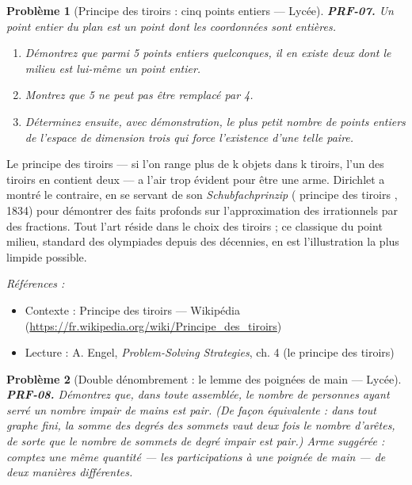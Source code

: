 \documentclass[11pt]{article}
\newtheorem{problem}{Problème}
\newenvironment{refs}{\par\small\noindent\emph{Références :}\begin{itemize}\setlength\itemsep{0pt}}{\end{itemize}\normalsize}
\begin{document}
\bigskip

\begin{problem}[{Principe des tiroirs : cinq points entiers --- Lycée}]
\textbf{PRF-07.} Un point entier du plan est un point dont les coordonnées sont
entières.
\begin{enumerate}
\item[(a)] Démontrez que parmi 5 points entiers quelconques, il en existe deux dont le milieu est
lui-même un point entier.
\item[(b)] Montrez que 5 ne peut pas être remplacé par 4.
\item[(c)] Déterminez ensuite, avec démonstration, le plus petit nombre de points entiers de
l'espace de dimension trois qui force l'existence d'une telle paire.
\end{enumerate}

\end{problem}

\noindent Le principe des tiroirs --- si l'on range plus de k objets dans k tiroirs,
l'un des tiroirs en contient deux --- a l'air trop évident pour être une arme. Dirichlet a
montré le contraire, en se servant de son \textit{Schubfachprinzip} (\og{} principe des tiroirs \fg{},
1834) pour démontrer des faits profonds sur l'approximation des irrationnels par des
fractions. Tout l'art réside dans le choix des tiroirs ; ce classique du point milieu,
standard des olympiades depuis des décennies, en est l'illustration la plus limpide
possible.

\begin{refs}
\item Contexte : Principe des tiroirs --- Wikipédia (\url{https://fr.wikipedia.org/wiki/Principe_des_tiroirs})
\item Lecture : A. Engel, \textit{Problem-Solving Strategies}, ch. 4 (le principe des tiroirs)
\end{refs}

\bigskip

\begin{problem}[{Double dénombrement : le lemme des poignées de main --- Lycée}]
\textbf{PRF-08.} Démontrez que, dans toute assemblée, le nombre de
personnes ayant serré un nombre impair de mains est pair. (De façon équivalente : dans tout
graphe fini, la somme des degrés des sommets vaut deux fois le nombre d'arêtes, de sorte que
le nombre de sommets de degré impair est pair.) Arme suggérée : comptez une même quantité ---
les participations à une poignée de main --- de deux manières différentes.
\end{problem}
\end{document}
